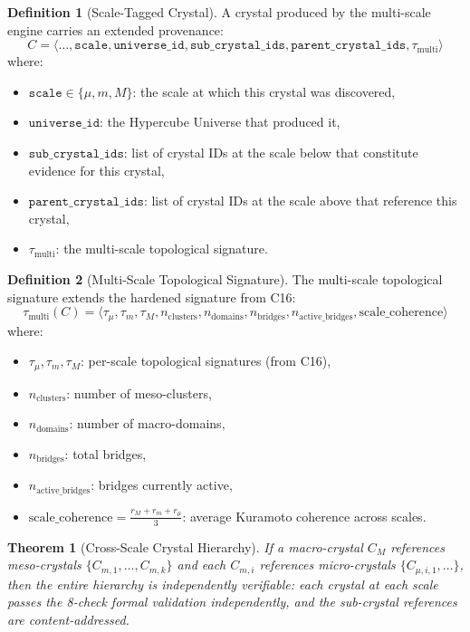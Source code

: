 \documentclass[11pt,a4paper,twoside]{article}
\theoremstyle{definition}
\newtheorem{definition}{Definition}[section]
\theoremstyle{plain}
\newtheorem{theorem}{Theorem}[section]
\theoremstyle{remark}
\begin{document}
\begin{definition}[Scale-Tagged Crystal]\label{def:scalecrystal}
A crystal produced by the multi-scale engine carries an extended
provenance:
\[
  C = \langle \ldots, \mathtt{scale}, \mathtt{universe\_id},
      \mathtt{sub\_crystal\_ids}, \mathtt{parent\_crystal\_ids},
      \tau_{\mathrm{multi}} \rangle
\]
where:
\begin{itemize}[nosep]
  \item $\mathtt{scale} \in \{\mu, m, M\}$: the scale at which this
        crystal was discovered,
  \item $\mathtt{universe\_id}$: the Hypercube Universe that produced
        it,
  \item $\mathtt{sub\_crystal\_ids}$: list of crystal IDs at the
        scale below that constitute evidence for this crystal,
  \item $\mathtt{parent\_crystal\_ids}$: list of crystal IDs at the
        scale above that reference this crystal,
  \item $\tau_{\mathrm{multi}}$: the multi-scale topological signature.
\end{itemize}
\end{definition}

\begin{definition}[Multi-Scale Topological Signature]\label{def:multitopo}
The multi-scale topological signature extends the hardened signature
from C16:
\[
  \tau_{\mathrm{multi}}(C) = \langle
    \tau_\mu, \tau_m, \tau_M,
    n_{\mathrm{clusters}}, n_{\mathrm{domains}},
    n_{\mathrm{bridges}}, n_{\mathrm{active\_bridges}},
    \mathrm{scale\_coherence}
  \rangle
\]
where:
\begin{itemize}[nosep]
  \item $\tau_\mu, \tau_m, \tau_M$: per-scale topological signatures
        (from C16),
  \item $n_{\mathrm{clusters}}$: number of meso-clusters,
  \item $n_{\mathrm{domains}}$: number of macro-domains,
  \item $n_{\mathrm{bridges}}$: total bridges,
  \item $n_{\mathrm{active\_bridges}}$: bridges currently active,
  \item $\mathrm{scale\_coherence} = \frac{r_M + r_m + r_\mu}{3}$:
        average Kuramoto coherence across scales.
\end{itemize}
\end{definition}

\begin{theorem}[Cross-Scale Crystal Hierarchy]\label{thm:crystalhier}
If a macro-crystal $C_M$ references meso-crystals
$\{C_{m,1}, \ldots, C_{m,k}\}$ and each $C_{m,i}$ references
micro-crystals $\{C_{\mu,i,1}, \ldots\}$, then the entire hierarchy
is independently verifiable: each crystal at each scale passes the
8-check formal validation independently, and the sub-crystal references
are content-addressed.
\end{theorem}
\end{document}
